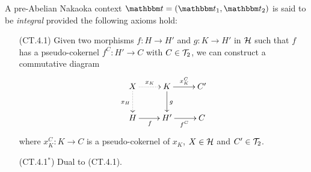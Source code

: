\begin{definition}
A pre-Abelian Nakaoka context $\t=(\t_1,\t_2)$ is said to be \emph{integral} provided the following axioms hold:
\begin{enumerate}
\item[(CT.4.1)] Given two morphisms $f\colon H\to H'$ and $g\colon K\to H'$ in $\mathcal{H}$ such that $f$ has a pseudo-cokernel $f^C\colon H'\to C$ with $C\in \mathcal{T}_2$, we can construct a commutative diagram
\[
\xymatrix{
X\ar@{.>}[d]_{x_H}\ar@{.>}[r]^{x_K}&K\ar[r]^{x_K^C}\ar[d]^{g}&C'\\
H\ar[r]_f&H'\ar[r]_{f^C}&C
}
\]
where $x_K^C\colon K\to C$ is a pseudo-cokernel of $x_K$, $X\in \mathcal{H}$ and $C'\in \mathcal{T}_2$.
\item[(CT.4.1$^*$)]  Dual to (CT.4.1).
\end{enumerate}
\end{definition}

